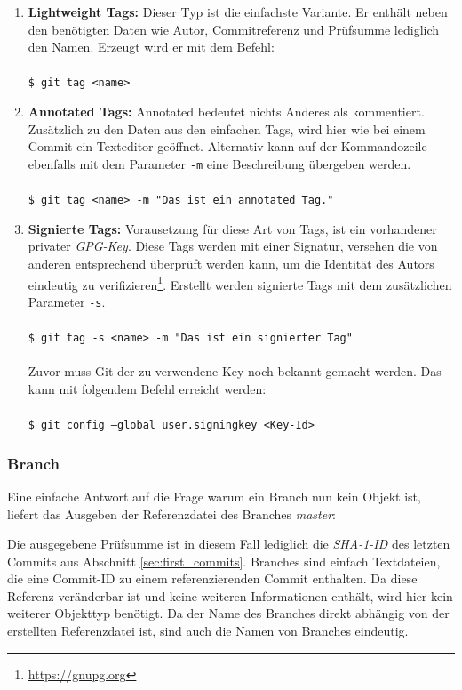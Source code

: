 \begin{enumerate}
\item \textbf{Lightweight Tags:} Dieser Typ ist die einfachste Variante. Er
enthält neben den benötigten Daten wie Autor, Commitreferenz und Prüfsumme
lediglich den Namen. Erzeugt wird er mit dem Befehl: \\\\\texttt{\$ git tag
<name>}\\
\item \textbf{Annotated Tags:} Annotated bedeutet nichts Anderes als
kommentiert. Zusätzlich zu den Daten aus den einfachen Tags, wird hier wie bei
einem Commit ein Texteditor geöffnet. Alternativ kann auf der Kommandozeile
ebenfalls mit dem Parameter \texttt{-m} eine Beschreibung übergeben
werden.\\\\\texttt{\$ git tag <name> -m "Das ist ein annotated Tag."}\\ 
\item \textbf{Signierte Tags:} Vorausetzung für diese Art von Tags, ist ein
vorhandener privater \textit{GPG-Key}. Diese Tags werden mit einer Signatur,
versehen die von anderen entsprechend überprüft werden kann, um die Identität
des Autors eindeutig zu verifizieren\footnote{\url{https://gnupg.org}}.
Erstellt werden signierte Tags mit dem zusätzlichen Parameter
\texttt{-s}.\\\\\texttt{\$ git tag -s  <name> -m "Das ist ein signierter
Tag"}\\\\ Zuvor muss Git der zu verwendene Key noch bekannt gemacht werden. Das
kann mit folgendem Befehl erreicht werden:\\\\\texttt{\$ git config --global
user.signingkey <Key-Id>}\\
\end{enumerate}

\subsubsection{Branch}\label{sec:branchobject}
Eine einfache Antwort auf die Frage warum ein Branch nun kein Objekt ist, liefert
das Ausgeben der Referenzdatei des Branches \textit{master}:



Die ausgegebene Prüfsumme ist in diesem Fall lediglich die \textit{SHA-1-ID} des
letzten Commits aus Abschnitt \ref{sec:first_commits}. Branches sind einfach
Textdateien, die eine Commit-ID zu einem referenzierenden Commit enthalten. Da
diese Referenz veränderbar ist und keine weiteren Informationen enthält, wird
hier kein weiterer Objekttyp benötigt. Da der Name des Branches direkt abhängig
von der erstellten Referenzdatei ist, sind auch die Namen von Branches
eindeutig.

